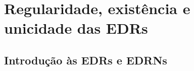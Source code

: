 \documentclass{beamer}
\theoremstyle{plain}
\theoremstyle{definition}
\begin{document}
%
%      
%
%
%

\section{Regularidade, existência e unicidade das EDRs}
\subsection{Introdução às EDRs e EDRNs}
\end{document}
